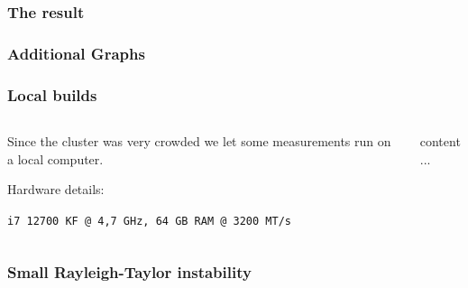 \begin{frame}
	\frametitle{The result}
	\begin{figure}[h!]
		\centering    
	\end{figure} 
\end{frame}


\begin{frame}
	\frametitle{Additional Graphs}
	\PraesentationBildUhrenturm
\end{frame}

\begin{frame}
	\frametitle{Local builds}
	\vspace{0.8cm}
	\begin{columns}
		\begin{column}{0.4\linewidth}
			\large
			Since the cluster was very crowded we let some measurements run on a local computer.
			
			Hardware details:
			
			\texttt{i7 12700 KF @ 4,7 GHz, 64 GB RAM @ 3200 MT/s}
		\end{column}
		\begin{column}{0.6\linewidth}
			content...
		\end{column}
	\end{columns}
	
	
	
\end{frame}


\begin{frame}
	\frametitle{Small Rayleigh-Taylor instability}
	
	\begin{figure}[h!]
		\centering    
	\end{figure} 
	
\end{frame}

